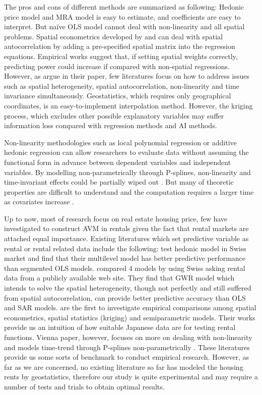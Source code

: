 \documentclass[a4paper, 12pt]{article} %
\begin{document}
The pros and cons of different methods are summarized as following: Hedonic price model and MRA model is easy to estimate, and coefficients are easy to interpret. But naïve OLS model cannot deal with non-linearity and all spatial problems. Spatial econometrics developed by \citet{anselin1990some} and \citet{kelejian1998suggested} can deal with spatial autocorrelation by adding a pre-specified spatial matrix into the regression equations. Empirical works suggest that, if setting spatial weights correctly, predicting power could increase if compared with non-spatial regressions. However, as \citet{martinetti2017approximate} argue in their paper, few literatures focus on how to address issues such as spatial heterogeneity, spatial autocorrelation, non-linearity and time invariance simultaneously. Geostatistics, which requires only geographical coordinates, is an easy-to-implement interpolation method. However, the kriging process, which excludes other possible explanatory variables may suffer information loss compared with regression methods and AI methods. 

Non-linearity methodologies such as local polynomial regression or additive hedonic regression can allow researchers to evaluate data without assuming the functional form in advance between dependent variables and independent variables. By modelling non-parametrically through P-splines, non-linearity and time-invariant effects could be partially wiped out \citep{brunauer2010additive}. But many of theoretic properties are difficult to understand and the computation requires a larger time as covariates increase \citep{opsomer1997fitting}.

Up to now, most of research focus on real estate housing price, few have investigated to construct AVM in rentals given the fact that rental markets are attached equal importance. Existing literatures which set predictive variable as rental or rental related data include the following: \citet{djurdjevic2008estimation} test hedonic model in Swiss market and find that their multilevel model has better predictive performance than segmented OLS models. \citet{lochl2010modelling} compared 4 models by using Swiss asking rental data from a publicly available web site. They find that GWR model which intends to solve the spatial heterogeneity, though not perfectly and still suffered from spatial autocorrelation, can provide better predictive accuracy than OLS and SAR models. \citet{seya2011empirical} are the first to investigate empirical comparisons among spatial econometrics, spatial statistics (kriging) and semiparametric models. Their works provide us an intuition of how suitable Japanese data are for testing rental functions. Vienna paper, however, focuses on more on dealing with non-linearity and models time-trend through P-splines non-parametrically \citep{brunauer2010additive}. These literatures provide us some sorts of benchmark to conduct empirical research. However, as far as we are concerned, no existing literature so far has modeled the housing rents by geostatistics, therefore our study is quite experimental and may require a number of tests and trials to obtain optimal results.  
\end{document}
